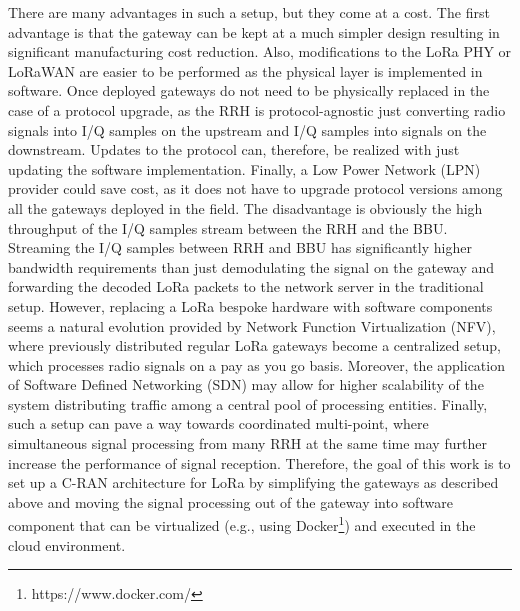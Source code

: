 There are many advantages in such a setup, but they come at a cost. 
The first advantage is that the gateway can be kept at a much simpler design resulting in significant manufacturing cost reduction. 
Also, modifications to the LoRa PHY or LoRaWAN are easier to be performed as the physical layer is implemented in software. 
Once deployed gateways do not need to be physically replaced in the case of a protocol upgrade, as the RRH is protocol-agnostic just converting radio signals into I/Q samples on the upstream and I/Q samples into signals on the downstream.
Updates to the protocol can, therefore, be realized with just updating the software implementation. 
Finally, a Low Power Network (LPN) provider could save cost, as it does not have to upgrade protocol versions among all the gateways deployed in the field.
The disadvantage is obviously the high throughput of the I/Q samples stream between the RRH and the BBU. 
Streaming the I/Q samples between RRH and BBU has significantly higher bandwidth requirements than just demodulating the signal on the gateway and forwarding the decoded LoRa packets to the network server in the traditional setup. 
However, replacing a LoRa bespoke hardware with software components seems a natural evolution provided by Network Function Virtualization (NFV), where previously distributed regular LoRa gateways become a centralized setup, which processes radio signals on a pay as you go basis. Moreover, the application of Software Defined Networking (SDN) may allow for higher scalability of the system distributing traffic among a central pool of processing entities. Finally, such a setup can pave a way towards coordinated multi-point, where simultaneous signal processing from many RRH at the same time may further increase the performance of signal reception.
Therefore, the goal of this work is to set up a C-RAN architecture for LoRa by simplifying the gateways as described above and moving the signal processing out of the gateway into software component that can be virtualized (e.g., using Docker\footnote{https://www.docker.com/}) and executed in the cloud environment. 

